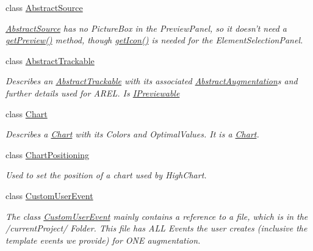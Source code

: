\begin{DoxyCompactItemize}
class \hyperlink{class_a_rdev_kit_1_1_model_1_1_project_1_1_abstract_source}{Abstract\-Source}
\begin{DoxyCompactList}\small\item\em \hyperlink{class_a_rdev_kit_1_1_model_1_1_project_1_1_abstract_source}{Abstract\-Source} has no Picture\-Box in the Preview\-Panel, so it doesn't need a \hyperlink{class_a_rdev_kit_1_1_model_1_1_project_1_1_abstract_source_abd9f742efb27a1fca992f6627c0421e4}{get\-Preview()} method, though \hyperlink{class_a_rdev_kit_1_1_model_1_1_project_1_1_abstract_source_ae698f1c9d55cc0603931bd2804d0c35d}{get\-Icon()} is needed for the Element\-Selection\-Panel. \end{DoxyCompactList}\item 
class \hyperlink{class_a_rdev_kit_1_1_model_1_1_project_1_1_abstract_trackable}{Abstract\-Trackable}
\begin{DoxyCompactList}\small\item\em Describes an \hyperlink{class_a_rdev_kit_1_1_model_1_1_project_1_1_abstract_trackable}{Abstract\-Trackable} with its associated \hyperlink{class_a_rdev_kit_1_1_model_1_1_project_1_1_abstract_augmentation}{Abstract\-Augmentation}s and further details used for A\-R\-E\-L. Is \hyperlink{interface_a_rdev_kit_1_1_model_1_1_project_1_1_i_previewable}{I\-Previewable} \end{DoxyCompactList}\item 
class \hyperlink{class_a_rdev_kit_1_1_model_1_1_project_1_1_chart}{Chart}
\begin{DoxyCompactList}\small\item\em Describes a \hyperlink{class_a_rdev_kit_1_1_model_1_1_project_1_1_chart}{Chart} with its Colors and Optimal\-Values. It is a \hyperlink{class_a_rdev_kit_1_1_model_1_1_project_1_1_chart}{Chart}. \end{DoxyCompactList}\item 
class \hyperlink{class_a_rdev_kit_1_1_model_1_1_project_1_1_chart_positioning}{Chart\-Positioning}
\begin{DoxyCompactList}\small\item\em Used to set the position of a chart used by High\-Chart. \end{DoxyCompactList}\item 
class \hyperlink{class_a_rdev_kit_1_1_model_1_1_project_1_1_custom_user_event}{Custom\-User\-Event}
\begin{DoxyCompactList}\small\item\em The class \hyperlink{class_a_rdev_kit_1_1_model_1_1_project_1_1_custom_user_event}{Custom\-User\-Event} mainly contains a reference to a file, which is in the /current\-Project/ Folder. This file has A\-L\-L Events the user creates (inclusive the template events we provide) for O\-N\-E augmentation. \end{DoxyCompactList}\item 

\end{DoxyCompactItemize}
